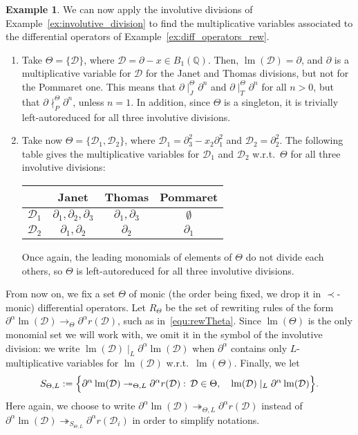 \documentclass[10pt]{easychair}
\theoremstyle{definition}
\newtheorem{example}[theorem]{Example}
\newcommand\D{\mathcal{D}}
\DeclareMathOperator{\lm}{lm}
\newcommand\Q{\mathbb{Q}}
\newcommand\Weyl[1]{B_{#1}(\Q)}
\newcommand\parTheta[1]{\twoheadrightarrow_{\Theta,#1}}
\newcommand\rewTheta{\to_\Theta}
\newcommand\divInv[1]{\mid_{#1}}
\newcommand\RTheta{R_{\Theta}}
\newcommand\SThetaL{S_{\Theta,L}}
\begin{document}
\begin{example}\label{ex:multiplicative_variables}
  We can now apply the involutive divisions of 
  Example~\ref{ex:involutive_division} to find the multiplicative
  variables associated to the differential operators of
  Example~\ref{ex:diff_operators_rew}.
  \begin{enumerate}
  \item Take $\Theta = \{\D\}$, where $\D = \partial - x \in \Weyl 1$.
    Then, $\lm(\D) =\partial$, and $\partial$ is a multiplicative
    variable for $\D$ for the Janet and Thomas divisions, but not for the
    Pommaret one. This means that $\partial \divInv{J}^\Theta \partial^n$
    and $\partial \divInv{T}^\Theta \partial^n$ for all $n > 0$, but that
    $\partial \nmid_P^\Theta \partial^n$, unless $n = 1$. In addition,
    since $\Theta$ is a singleton, it is trivially left-autoreduced for
    all three involutive divisions. 
  \item Take now $\Theta = \{\D_1,\D_2\}$, where
    $\D_1=\partial_3^2 - x_2\partial_1^2$ and $\D_2 = \partial_2^2$. The
    following table gives the multiplicative variables for $\D_1$ and
    $\D_2$ w.r.t.\ $\Theta$ for all three involutive divisions:
    \begin{center}
    \begin{tabular}{l|ccc}
      & Janet & Thomas & Pommaret \\ \hline
      $\D_1$ & $\partial_1, \partial_2, \partial_3$ & $\partial_1, \partial_3$ & $\emptyset$ \\
      $\D_2$ & $\partial_1, \partial_2$ & $\partial_2$ & $\partial_1$ \\
    \end{tabular}
  \end{center}
    Once again, the leading monomials of elements of $\Theta$ do not divide
    each others, so $\Theta$ is left-autoreduced for all three involutive
    divisions.
  \end{enumerate}
\end{example}
\smallskip


From now on, we fix a set $\Theta$ of monic (the order being fixed, we
drop it in $\prec$-monic) differential operators. Let $\RTheta$  be the
set of rewriting rules of the form
$\partial^\alpha\lm(\D)\rewTheta\partial^\alpha r(\D)$, such as
in~\eqref{equ:rewTheta}. Since $\lm(\Theta)$ is the only monomial set we
will work with, we omit it in the symbol of the involutive division: we
write $\lm(\D)\divInv{L}\partial^\alpha\lm(\D)$ when $\partial^\alpha$
contains only $L$-multiplicative variables for $\lm(\D)$ w.r.t.\
$\lm(\Theta)$. Finally, we let
\begin{equation}\label{equ:S-strategy}
  \SThetaL:=\Big\{\partial^\alpha\lm(\D)\parTheta{L}\partial^\alpha
  r(\D) : \, \D\in\Theta,\quad\lm(\D)\divInv{L}\partial^\alpha\lm(\D)
  \Big\}.
  \smallskip
\end{equation}
Here again, we choose to write
$\partial^\alpha\lm(\D)\parTheta{L}\partial^\alpha r(\D)$ instead of
$\partial^\alpha\lm(\D)\twoheadrightarrow_{\SThetaL}\partial^\alpha
r(\D_i)$ in order to simplify notations.
\smallskip
\end{document}
